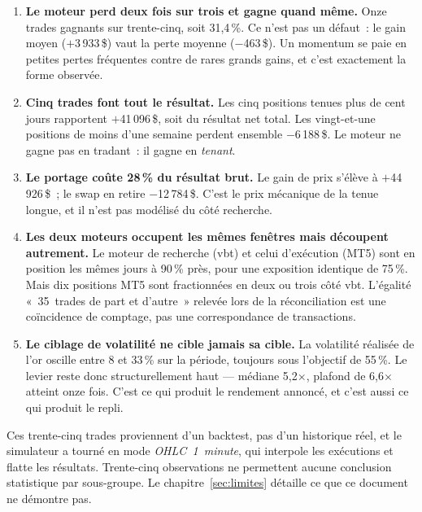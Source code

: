 \begin{enumerate}[leftmargin=1.4em, itemsep=0.45em]

\item \textbf{Le moteur perd deux fois sur trois et gagne quand même.} Onze
trades gagnants sur trente-cinq, soit 31,4\,\%. Ce n'est pas un défaut~: le gain
moyen ($+$3\,933\,\$) vaut  la perte moyenne ($-$463\,\$). Un
momentum se paie en petites pertes fréquentes contre de rares grands gains, et
c'est exactement la forme observée.

\item \textbf{Cinq trades font tout le résultat.} Les cinq positions tenues plus
de cent jours rapportent $+$41\,096\,\$, soit  du résultat net
total. Les vingt-et-une positions de moins d'une semaine perdent ensemble
$-$6\,188\,\$. Le moteur ne gagne pas en tradant~: il gagne en \emph{tenant}.

\item \textbf{Le portage coûte 28\,\% du résultat brut.} Le gain de prix
s'élève à $+$44\,926\,\$~; le swap en retire $-$12\,784\,\$. C'est le prix
mécanique de la tenue longue, et il n'est pas modélisé du côté recherche.

\item \textbf{Les deux moteurs occupent les mêmes fenêtres mais découpent
autrement.} Le moteur de recherche (vbt) et celui d'exécution (MT5) sont en
position les mêmes jours à 90\,\% près, pour une exposition identique de
75\,\%. Mais dix positions MT5 sont fractionnées en deux ou trois côté vbt.
L'égalité «~35~trades de part et d'autre~» relevée lors de la réconciliation est
une coïncidence de comptage, pas une correspondance de transactions.

\item \textbf{Le ciblage de volatilité ne cible jamais sa cible.} La volatilité
réalisée de l'or oscille entre 8 et 33\,\% sur la période, toujours sous
l'objectif de 55\,\%. Le levier reste donc structurellement haut --- médiane
5,2$\times$, plafond de 6,6$\times$ atteint onze fois. C'est ce qui produit le
rendement annoncé, et c'est aussi ce qui produit le repli.

\end{enumerate}

\begin{warningbox}
Ces trente-cinq trades proviennent d'un backtest, pas d'un historique réel, et
le simulateur a tourné en mode \emph{OHLC~1~minute}, qui interpole les
exécutions et flatte les résultats. Trente-cinq observations ne permettent
aucune conclusion statistique par sous-groupe. Le chapitre~\ref{sec:limites}
détaille ce que ce document ne démontre pas.
\end{warningbox}


